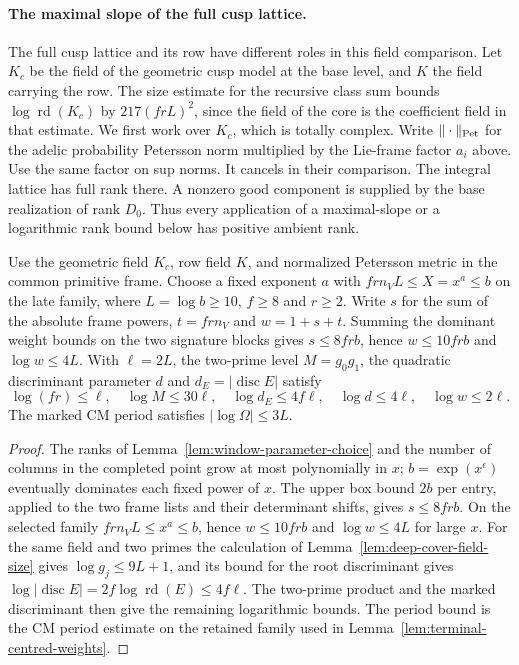 \paragraph{The maximal slope of the full cusp lattice.}
\label{par:parent-full-cusp-slope}
The full cusp lattice and its row have different roles in this field comparison. Let \(K_c\)
be the field of the geometric cusp model at the base level,
and \(K\) the field carrying the row. The size estimate for the
recursive class sum bounds \(\log\operatorname{rd}(K_c)\) by
\(217(frL)^2\), since the field of the core is the coefficient
field in that estimate. We first work over \(K_c\), which is
totally complex. Write \(\|\cdot\|_{\rm Pet}\) for the adelic probability
Petersson norm multiplied by the Lie-frame factor \(a_i\)
above. Use the same factor on sup norms. It cancels in their
comparison. The integral lattice
has full rank there. A nonzero good component is supplied by the
base realization of rank \(D_0\). Thus every application of a
maximal-slope or a logarithmic rank bound below has positive
ambient rank. \label{cor:parent-cusp-slope-1}

\begin{established}\label{hyp:parent-cusp-size}
Use the geometric field \(K_c\), row field \(K\), and normalized
Petersson metric in the common primitive frame. Choose a fixed exponent \(a\) with \(frn_V L\le X=x^a\le b\) on the late family, where
\(L=\log b\ge10\), \(f\ge8\) and \(r\ge2\).
Write \(s\) for the sum of the absolute frame powers, \(t=frn_V\)
and \(w=1+s+t\). Summing the dominant weight bounds on the
two signature blocks gives \(s\le8frb\), hence
\(w\le10frb\) and \(\log w\le4L\).
With \(\ell=2L\), the two-prime level \(M=g_0g_1\), the
quadratic discriminant parameter \(d\) and \(d_E=|\operatorname{disc}E|\)
satisfy
\[
 \log(fr)\le\ell,\quad \log M\le30\ell,\quad
 \log d_E\le4f\ell,\quad \log d\le4\ell,\quad \log w\le2\ell.
\]
The marked CM period satisfies \(|\log\Omega|\le3L\).
\end{established}
\begin{proof}
The ranks of Lemma~\ref{lem:window-parameter-choice} and the number of columns in the completed point grow at most polynomially in \(x\); \(b=\exp(x^\epsilon)\) eventually dominates each fixed power of \(x\). The upper box bound \(2b\) per entry, applied to the two frame lists and their determinant shifts, gives \(s\le8frb\). On the selected family \(frn_VL\le x^a\le b\), hence \(w\le10frb\) and \(\log w\le4L\) for large \(x\). For the same field and two primes the calculation of Lemma~\ref{lem:deep-cover-field-size} gives \(\log g_j\le9L+1\), and its bound for the root discriminant gives \(\log |\operatorname{disc} E|=2f\log\operatorname{rd}(E)\le 4f\ell\). The two-prime product and the marked discriminant then give the remaining logarithmic bounds. The period bound is the CM period estimate on the retained family used in Lemma~\ref{lem:terminal-centred-weights}.
\end{proof}

